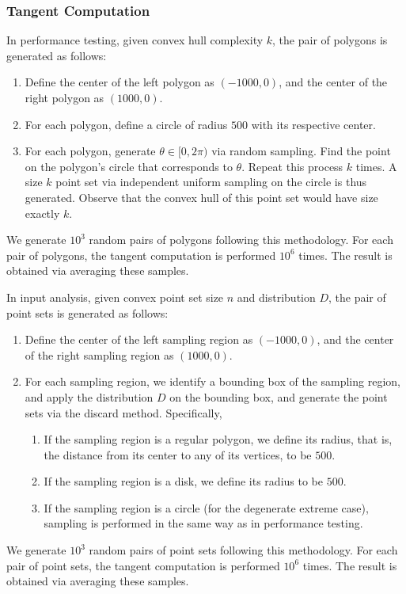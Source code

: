\documentclass{article}
\begin{document}
\begin{appendices}
    \subsubsection{Tangent Computation}

    In performance testing, given convex hull complexity $k$, the pair of polygons is generated as follows:
    \begin{enumerate}
        \item Define the center of the left polygon as $(-1000, 0)$, and the center of the right polygon as $(1000, 0)$.
        \item For each polygon, define a circle of radius $500$ with its respective center.
        \item For each polygon, generate $\theta \in [0, 2\pi)$ via random sampling. Find the point on the polygon's circle that corresponds to $\theta$. Repeat this process $k$ times. A size $k$ point set via independent uniform sampling on the circle is thus generated. Observe that the convex hull of this point set would have size exactly $k$. 
    \end{enumerate}
    We generate $10^3$ random pairs of polygons following this methodology. For each pair of polygons, the tangent computation is performed $10^6$ times. The result is obtained via averaging these samples. 

    In input analysis, given convex point set size $n$ and distribution $D$, the pair of point sets is generated as follows:
    \begin{enumerate}
        \item Define the center of the left sampling region as $(-1000, 0)$, and the center of the right sampling region as $(1000, 0)$.
        \item For each sampling region, we identify a bounding box of the sampling region, and apply the distribution $D$ on the bounding box, and generate the point sets via the discard method. Specifically,
        \begin{enumerate}
            \item If the sampling region is a regular polygon, we define its radius, that is, the distance from its center to any of its vertices, to be $500$.
            \item If the sampling region is a disk, we define its radius to be $500$.
            \item If the sampling region is a circle (for the degenerate extreme case), sampling is performed in the same way as in performance testing.
        \end{enumerate}
    \end{enumerate}
    We generate $10^3$ random pairs of point sets following this methodology. For each pair of point sets, the tangent computation is performed $10^6$ times. The result is obtained via averaging these samples.
\end{appendices}
\end{document}
